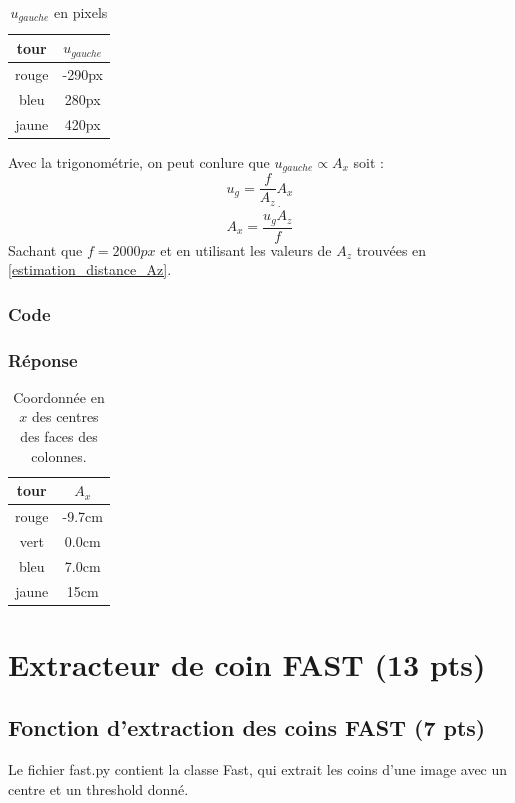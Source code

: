 \documentclass[12pt]{article}
\begin{document}
\begin{table}[h]
    \caption{$u_{gauche}$ en pixels}
\label{TableCoord}
\begin{center}
\begin{tabular}{|c|c|}
\hline
    tour   &  $u_{gauche}$\\
\hline
    rouge  & -290px  \\
    bleu   & 280px   \\
    jaune  & 420px   \\
\hline
\end{tabular}
\end{center}
\end{table}

Avec la trigonométrie, on peut conlure que $u_{gauche} \propto A_x$ soit :
\[ u_g = \frac{f}{A_z}A_x\]
\[ A_x = \frac{u_g \dot A_z}{f} \]
Sachant que $f = 2000px$ et en utilisant les valeurs de $A_z$ trouvées en \ref{estimation_distance_Az}.

\subsubsection{Code}
\subsubsection{Réponse}

\begin{table}[h]
\caption{Coordonnée en $x$ des centres des faces des colonnes.}
\label{TableX}
\begin{center}
\begin{tabular}{|c|c|}
\hline
 tour   &  $A_x$ \\
\hline
 rouge  &  -9.7cm     \\
 vert   &  0.0cm   \\
 bleu   &  7.0cm    \\
 jaune  &  15cm     \\
\hline
\end{tabular}
\end{center}
\end{table}


\newpage
\section{Extracteur de coin FAST (13 pts)}
 \label{SectionFAST}

\subsection{Fonction d'extraction des coins FAST (7 pts)}
Le fichier fast.py contient la classe Fast, qui extrait les coins d'une image avec un centre et un threshold donn\'e.  
\end{document}
